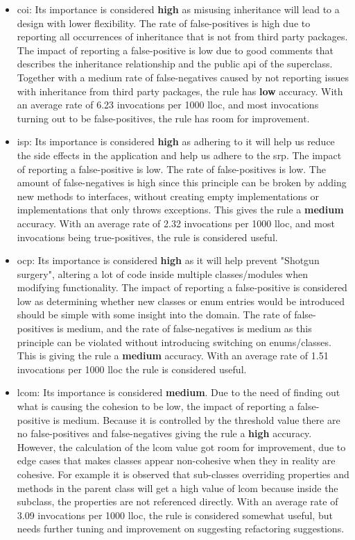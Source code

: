 \documentclass[pdftex,10pt,b5paper,twoside]{report}
\begin{document}
\begin{itemize}

    \item \gls{coi}: Its importance is considered \textbf{high} as misusing inheritance will lead to a design with lower flexibility. The rate of false-positives is high due to reporting all occurrences of inheritance that is not from third party packages. The impact of reporting a false-positive is low due to good comments that describes the inheritance relationship and the public \gls{api} of the superclass. Together with a medium rate of false-negatives caused by not reporting issues with inheritance from third party packages, the rule has \textbf{low} accuracy. With an average rate of 6.23 invocations per 1000 \gls{lloc}, and most invocations turning out to be false-positives, the rule has room for improvement. 

    \item \gls{isp}: Its importance is considered \textbf{high} as adhering to it will help us reduce the side effects in the application and help us adhere to the \gls{srp}. The impact of reporting a false-positive is low. The rate of false-positives is low. The amount of false-negatives is high since this principle can be broken by adding new methods to interfaces, without creating empty implementations or implementations that only throws exceptions. This gives the rule a \textbf{medium} accuracy. With an average rate of 2.32 invocations per 1000 \gls{lloc}, and most invocations being true-positives, the rule is considered useful.
    
    \item \gls{ocp}: Its importance is considered \textbf{high} as it will help prevent "Shotgun surgery", altering a lot of code inside multiple classes/modules when modifying functionality. The impact of reporting a false-positive is considered low as determining whether new classes or enum entries would be introduced should be simple with some insight into the domain. The rate of false-positives is medium, and the rate of false-negatives is medium as this principle can be violated without introducing switching on enums/classes. This is giving the rule a \textbf{medium} accuracy. With an average rate of 1.51 invocations per 1000 \gls{lloc} the rule is considered useful.
    
    \item \gls{lcom}: Its importance is considered \textbf{medium}. Due to the need of finding out what is causing the cohesion to be low, the impact of reporting a false-positive is medium. Because it is controlled by the threshold value there are no false-positives and false-negatives giving the rule a \textbf{high} accuracy. However, the calculation of the \gls{lcom} value got room for improvement, due to edge cases that makes classes appear non-cohesive when they in reality are cohesive. For example it is observed that sub-classes overriding properties and methods in the parent class will get a high value of \gls{lcom} because inside the subclass, the properties are not referenced directly. With an average rate of 3.09 invocations per 1000 \gls{lloc}, the rule is considered somewhat useful, but needs further tuning and improvement on suggesting refactoring suggestions. 


\end{itemize}
\end{document}
